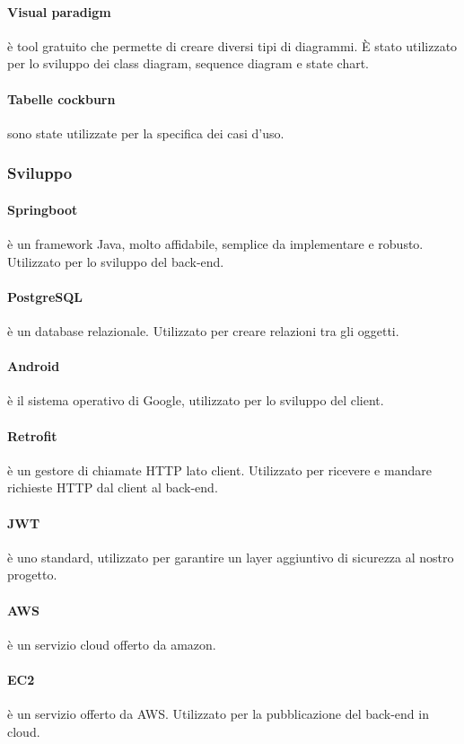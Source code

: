 \paragraph{Visual paradigm} è tool gratuito che permette di creare diversi tipi di diagrammi. \`{E} stato utilizzato per lo sviluppo dei class diagram, sequence diagram e state chart.
\paragraph{Tabelle cockburn} sono state utilizzate per la specifica dei casi d'uso.
\subsubsection{Sviluppo}
\paragraph{Springboot} è un framework Java, molto affidabile, semplice da implementare e robusto. Utilizzato per lo sviluppo del back-end.
\paragraph{PostgreSQL} è un database relazionale. Utilizzato per creare relazioni tra gli oggetti.
\paragraph{Android} è il sistema operativo di Google, utilizzato per lo sviluppo del client.
\paragraph{Retrofit} è un gestore di chiamate HTTP lato client. Utilizzato per ricevere e mandare richieste HTTP dal client al back-end.
\paragraph{JWT} è uno standard, utilizzato per garantire un layer aggiuntivo di sicurezza al nostro progetto.
\paragraph{AWS} è un servizio cloud offerto da amazon.
\paragraph{EC2} è un servizio offerto da AWS. Utilizzato per la pubblicazione del back-end in cloud.
